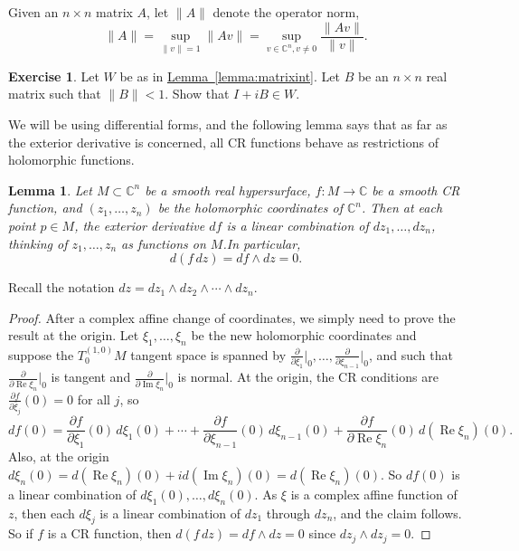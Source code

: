\documentclass[12pt,openany]{book}
\renewcommand{\Re}{\operatorname{Re}}
\renewcommand{\Im}{\operatorname{Im}}
\newcommand{\snorm}[1]{\lVert {#1} \rVert}
\newcommand{\C}{{\mathbb{C}}}
\theoremstyle{plain}
\newtheorem{lemma}[thm]{Lemma}
\theoremstyle{remark}
\theoremstyle{definition}
\newenvironment{exbox}{%
    \def\FrameCommand{\vrule width 1pt \relax\hspace{10pt}}%
    \MakeFramed {\advance \hsize -\width \FrameRestore}%
}{%
    \endMakeFramed
}
\theoremstyle{exercise}
\newtheorem{exercise}{Exercise}[section]
\theoremstyle{example}
\newcommand{\lemmaref}[1]{\hyperref[#1]{Lemma~\ref*{#1}}}
\begin{document}
Given an $n \times n$ matrix $A$, let $\snorm{A}$ denote the operator norm,
\begin{equation*}
\snorm{A} = \sup_{\snorm{v}=1} \snorm{Av} = \sup_{v \in \C^n, v\not= 0}
\frac{\snorm{Av}}{\snorm{v}} .
\end{equation*}

\begin{exbox}
\begin{exercise}
Let $W$ be as in \lemmaref{lemma:matrixint}.  Let $B$ be an $n \times n$
real matrix such that $\snorm{B} < 1$.   Show that $I + iB \in W$.
\end{exercise}
\end{exbox}

We will be using differential forms, and the following lemma says
that as far as the exterior
derivative is concerned, all CR functions behave as
restrictions of holomorphic functions.

\begin{lemma} \label{lemma:crdf}
Let $M \subset \C^n$ be a smooth real hypersurface, $f \colon M \to \C$
be a smooth CR function, and $(z_1,\ldots,z_n)$ be the holomorphic
coordinates of $\C^n$.  Then at each point $p \in M$,
the exterior derivative
$df$ is a linear combination of $dz_1,\ldots,dz_n$,
thinking of $z_1,\ldots,z_n$ as functions on $M$.\linebreak[1]
In particular,
\begin{equation*}
d(f \, dz) = df \wedge dz = 0.
\end{equation*}
\end{lemma}

Recall the notation $dz = dz_1 \wedge dz_2 \wedge \cdots \wedge dz_n$.

\begin{proof}
After a complex affine change of coordinates, we simply
need to prove the result at the origin.  Let
$\xi_1,\ldots,\xi_n$ be
the new holomorphic coordinates
and suppose the $T^{(1,0)}_0 M$ tangent space is spanned
by
$\frac{\partial}{\partial \xi_1}\big|_0,
\ldots,
\frac{\partial}{\partial \xi_{n-1}}\big|_0$,
and such that $\frac{\partial}{\partial \Re \xi_n}\big|_0$ is tangent
and $\frac{\partial}{\partial \Im \xi_n}\big|_0$ is normal.
At the origin, the CR conditions are
$\frac{\partial f}{\partial \bar{\xi}_j}(0) = 0$ for all $j$, so
\begin{equation*}
df(0) =
\frac{\partial f}{\partial \xi_1}(0) \, d\xi_1(0) + \cdots +
\frac{\partial f}{\partial \xi_{n-1}}(0) \, d\xi_{n-1}(0)  +
\frac{\partial f}{\partial \Re \xi_{n}}(0) \, d(\Re \xi_{n})(0) 
.
\end{equation*}
Also, at the origin $d\xi_n(0) = d(\Re \xi_n)(0) + i d(\Im \xi_n)(0) = d(\Re \xi_n)(0)$.
So $df(0)$ is a linear combination of $d\xi_1(0),\ldots,d\xi_n(0)$.
As $\xi$ is a complex affine function of $z$, then each $d\xi_j$ is a linear
combination of $dz_1$ through $dz_n$, and the claim follows.
So if $f$ is a CR function, then
$d(f\,dz) = df \wedge dz = 0$ since $dz_j \wedge dz_j = 0$.
\end{proof}
\end{document}
